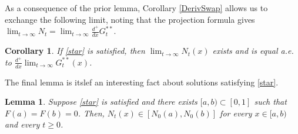 \documentclass[10pt,a4paper]{amsart}
\newtheorem{cor}[thm]{Corollary}
\newtheorem{lemma}[thm]{Lemma}
\numberwithin{equation}{section}
\begin{document}
As a consequence of the prior lemma, Corollary \ref{DerivSwap} allows us to exchange the following limit, noting that the projection formula gives $\lim_{t\to\infty} N_t=\lim_{t\to\infty} \frac{d^+}{dx}G_t^{**}$.

\begin{cor}\label{sufficient-cor}
    If \eqref{star} is satisfied, then $\displaystyle\lim_{t\to\infty} N_t(x)$ exists and is equal a.e. to $\displaystyle\frac{d^+}{dx}\lim_{t\to\infty} G_t^{**}(x)$.
\end{cor}

The final lemma is itslef an interesting fact about solutions satisfying \eqref{star}. 
\begin{lemma}\label{N-contained}
    {Suppose \eqref{star} is satisfied and there exists $[a,b)\subset[0,1]$ such that $F(a)=F(b)=0$. Then, $N_t(x)\in [N_0(a),N_0(b)]$ for every $x\in[a,b)$ and every $t\geq0$}.
\end{lemma}
\end{document}
